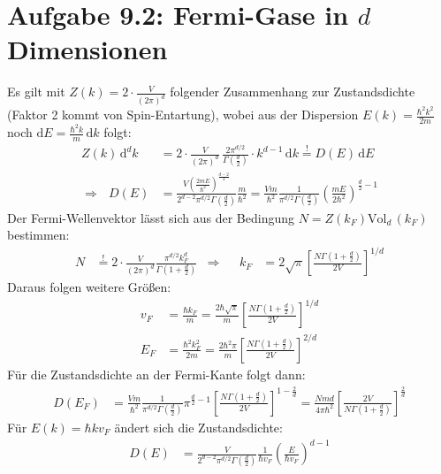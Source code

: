 \documentclass[a4paper,12pt]{article}
\newcommand{\kla}{}
\newcommand{\klam}{}
\newcommand{\tecxt}{}
\begin{document}
\section*{Aufgabe 9.2: Fermi-Gase in $d$ Dimensionen}
Es gilt mit $Z(k)=2\cdot\frac{V}{(2\pi)^d}$ folgender Zusammenhang zur Zustandsdichte (Faktor 2 kommt von Spin-Entartung), wobei aus der Dispersion $E(k)=\frac{\hbar^2k^2}{2m}$ noch $\tecxt\text{d}E=\frac{\hbar^2k}{m}\,\tecxt\text{d}k$ folgt:
\begin{align*}
Z(k)\,\tecxt\text{d}^dk&=2\cdot\frac{V}{(2\pi)^d}\,\frac{2\pi^{d/2}}{\Gamma\kla\left( {\frac{d}{2}} \right)}\cdot k^{d-1}\,\tecxt\text{d}k\overset{!}{=}D(E)\,\tecxt\text{d}E\\
\Rightarrow\ \ \ D(E)&=\frac{V\kla\left( {\frac{2mE}{\hbar^2}} \right)^{\frac{d-2}{2}}}{2^{d-2}\pi^{d/2}\Gamma\kla\left( {\frac{d}{2}} \right)}\frac{m}{\hbar^2}=\frac{Vm}{\hbar^2}\frac{1}{\pi^{d/2}\Gamma\kla\left( {\frac{d}{2}} \right)}\kla\left( {\frac{mE}{2\hbar^2}} \right)^{\frac{d}{2}-1}
\end{align*}
Der Fermi-Wellenvektor lässt sich aus der Bedingung $N=Z(k_F)\tecxt\text{Vol}_d\,(k_F)$ bestimmen:
\begin{align*}
N&\overset{!}{=}2\cdot\frac{V}{(2\pi)^d}\frac{\pi^{d/2}k_F^d}{\Gamma\kla\left( {1+\frac{d}{2}} \right)}& \Rightarrow && k_F&=2\sqrt{\pi}\klam\left[ {\frac{N \Gamma\kla\left( {1+\frac{d}{2}} \right)}{2V}} \right]^{1/d}
\end{align*}
Daraus folgen weitere Größen:
\begin{align*}
v_F&=\frac{\hbar k_F}{m}=\frac{2\hbar\sqrt{\pi}}{m}\klam\left[ {\frac{N \Gamma\kla\left( {1+\frac{d}{2}} \right)}{2V}} \right]^{1/d}\\
E_F&=\frac{\hbar^2k_F^2}{2m}=\frac{2\hbar^2\pi}{m}\klam\left[ {\frac{N \Gamma\kla\left( {1+\frac{d}{2}} \right)}{2V}} \right]^{2/d}
\end{align*}
Für die Zustandsdichte an der Fermi-Kante folgt dann:
\begin{align*}
D(E_F)&=\frac{Vm}{\hbar^2}\frac{1}{\pi^{d/2}\Gamma\kla\left( {\frac{d}{2}} \right)}\pi^{\frac{d}{2}-1}\klam\left[ {\frac{N\Gamma\kla\left( {1+\frac{d}{2}} \right)}{2V}} \right]^{1-\frac{2}{d}}=\frac{Nmd}{4\pi \hbar^2}\klam\left[ {\frac{2V}{N\Gamma\kla\left( {1+\frac{d}{2}} \right)}} \right]^{\frac{2}{d}}
\end{align*}
Für $E(k)=\hbar kv_F$ ändert sich die Zustandsdichte:
\begin{align*}
D(E)&=\frac{V}{2^{d-2}\pi^{d/2}\Gamma\kla\left( {\frac{d}{2}} \right)}\frac{1}{\hbar v_F}\kla\left( {\frac{E}{\hbar v_F}} \right)^{d-1}
\end{align*}
\end{document}
